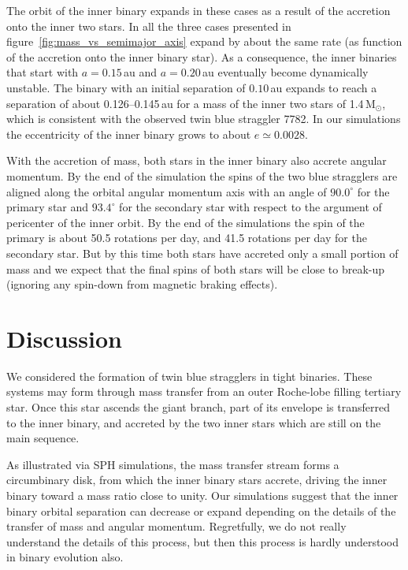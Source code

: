 \documentclass{aastex62}
\newcommand{\MSun}{\mbox{M$_\odot$}}
\begin{document}
The orbit of the inner binary expands in these cases as a result of
the accretion onto the inner two stars. In all the three cases
presented in figure~\ref{fig:mass_vs_semimajor_axis} expand by about
the same rate (as function of the accretion onto the inner binary
star). As a consequence, the inner binaries that start with $a =
0.15$\,au and $a=0.20$\,au eventually become dynamically unstable.
The binary with an initial separation of $0.10$\,au expands to reach a
separation of about 0.126--0.145\,au for a mass of the inner two stars
of 1.4\,\MSun, which is consistent with the observed twin blue
straggler 7782. In our simulations the eccentricity of the inner
binary grows to about $e \simeq 0.0028$.

With the accretion of mass, both stars in the inner binary also
accrete angular momentum.  By the end of the simulation the spins of
the two blue stragglers are aligned along the orbital angular momentum
axis with an angle of $90.0^\circ$ for the primary star and
$93.4^\circ$ for the secondary star with respect to the argument of
pericenter of the inner orbit.  By the end of the simulations the spin
of the primary is about 50.5 rotations per day, and 41.5 rotations per
day for the secondary star. But by this time both stars have accreted
only a small portion of mass and we expect that the final spins of
both stars will be close to break-up (ignoring any spin-down from
magnetic braking effects).

\section{Discussion} \label{sect:discussion}

We considered the formation of twin blue stragglers in tight binaries.
These systems may form through mass transfer from an outer Roche-lobe
filling tertiary star. Once this star ascends the giant branch, part
of its envelope is transferred to the inner binary, and accreted by
the two inner stars which are still on the main sequence.

As illustrated via SPH simulations, the mass transfer stream forms a
circumbinary disk, from which the inner binary stars accrete, driving
the inner binary toward a mass ratio close to unity.  Our simulations
suggest that the inner binary orbital separation can decrease or
expand depending on the details of the transfer of mass and angular
momentum. Regretfully, we do not really understand the details of this
process, but then this process is hardly understood in binary
evolution also.
\end{document}
